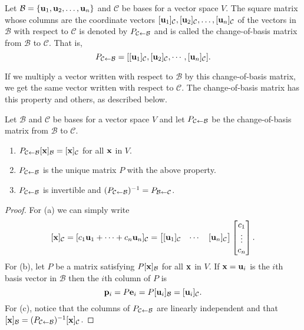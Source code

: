 \documentclass[../m073main.tex]{subfiles}
\begin{document}
\begin{definition}
	Let $\mathcal{B} = \{\mathbf{u}_1, \mathbf{u}_2, \ldots, \mathbf{u}_n\}$ and $\mathcal{C}$ be bases for a vector space $V$.
	The square matrix whose columns are the coordinate vectors $[\mathbf{u}_1]_{\mathcal{C}}, [\mathbf{u}_2]_{\mathcal{C}}, \ldots, [\mathbf{u}_n]_{\mathcal{C}}$ of the vectors in $\mathcal{B}$ with respect to $\mathcal{C}$ is denoted by $P_{\mathcal{C} \leftarrow \mathcal{B}}$ and is called the change-of-basis matrix from $\mathcal{B}$ to $\mathcal{C}$.
	That is,
	\[ P_{\mathcal{C} \leftarrow \mathcal{B}} = [[\mathbf{u}_1]_{\mathcal{C}}, [\mathbf{u}_2]_{\mathcal{C}}, \cdots, [\mathbf{u}_n]_{\mathcal{C}}]. \]
\end{definition}

If we multiply a vector written with respect to $\mathcal{B}$ by this change-of-basis matrix, we get the same vector written with respect to $\mathcal{C}$.
The change-of-basis matrix has this property and others, as described below.

\begin{theorem}
	Let $\mathcal{B}$ and $\mathcal{C}$ be bases for a vector space $V$ and let $P_{\mathcal{C} \leftarrow \mathcal{B}}$ be the change-of-basis matrix from $\mathcal{B}$ to $\mathcal{C}$.
	\begin{enumerate}[label=(\alph*)]
		\item $P_{\mathcal{C} \leftarrow \mathcal{B}}[\mathbf{x}]_{\mathcal{B}} = [\mathbf{x}]_{\mathcal{C}}$ for all $\mathbf{x}$ in $V$.
		\item $P_{\mathcal{C} \leftarrow \mathcal{B}}$ is the unique matrix $P$ with the above property.
		\item $P_{\mathcal{C} \leftarrow \mathcal{B}}$ is invertible and $(P_{\mathcal{C} \leftarrow \mathcal{B}})^{-1} = P_{\mathcal{B} \leftarrow \mathcal{C}}$.
	\end{enumerate}
\end{theorem}

\begin{proof}
	For (a) we can simply write
	\[ [\mathbf{x}]_\mathcal{C} = [c_1 \mathbf{u}_1 + \cdots + c_n \mathbf{u}_n]_\mathcal{C} = \begin{bmatrix} [\mathbf{u}_1]_\mathcal{C} & \cdots & [\mathbf{u}_n]_\mathcal{C} \end{bmatrix} \begin{bmatrix} c_1 \\ \vdots \\ c_n \end{bmatrix}. \]
	For (b), let $P$ be a matrix satisfying $P [\mathbf{x}]_\mathcal{B}$ for all $\mathbf{x}$ in $V$.
	If $\mathbf{x} = \mathbf{u}_i$ is the $i$th basis vector in $\mathcal B$ then the $i$th column of $P$ is
	\[ \mathbf{p}_i = P \mathbf{e}_i = P [\mathbf{u}_i]_\mathcal{B} = [\mathbf{u}_i]_\mathcal{C}. \]
	For (c), notice that the columns of $P_{\mathcal C \leftarrow \mathcal B}$ are linearly independent and that $[\mathbf{x}]_{\mathcal B} = (P_{\mathcal C \leftarrow \mathcal B})^{-1} [\mathbf{x}]_{\mathcal C}$.
\end{proof}
\end{document}
